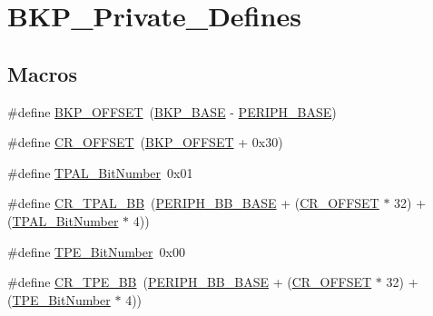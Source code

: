 \hypertarget{group___b_k_p___private___defines}{}\section{B\+K\+P\+\_\+\+Private\+\_\+\+Defines}
\label{group___b_k_p___private___defines}
\subsection*{Macros}
\begin{DoxyCompactItemize}
\item 
\#define \mbox{\hyperlink{group___b_k_p___private___defines_gaaaf71f474657e7c0c5b0d6ba9697cf5d}{B\+K\+P\+\_\+\+O\+F\+F\+S\+ET}}~(\mbox{\hyperlink{group___peripheral__memory__map_gaa15d5a9f40794105397ba5ea567c4ae1}{B\+K\+P\+\_\+\+B\+A\+SE}} -\/ \mbox{\hyperlink{group___peripheral__memory__map_ga9171f49478fa86d932f89e78e73b88b0}{P\+E\+R\+I\+P\+H\+\_\+\+B\+A\+SE}})
\item 
\#define \mbox{\hyperlink{group___b_k_p___private___defines_gafa1d3d0ea72132df651c76fc1bdffffc}{C\+R\+\_\+\+O\+F\+F\+S\+ET}}~(\mbox{\hyperlink{group___b_k_p___private___defines_gaaaf71f474657e7c0c5b0d6ba9697cf5d}{B\+K\+P\+\_\+\+O\+F\+F\+S\+ET}} + 0x30)
\item 
\#define \mbox{\hyperlink{group___b_k_p___private___defines_ga4af1869d665b8804104b6754c787820a}{T\+P\+A\+L\+\_\+\+Bit\+Number}}~0x01
\item 
\#define \mbox{\hyperlink{group___b_k_p___private___defines_gaa36e52f37b9fa6982bd224a6dcb86f78}{C\+R\+\_\+\+T\+P\+A\+L\+\_\+\+BB}}~(\mbox{\hyperlink{group___peripheral__memory__map_gaed7efc100877000845c236ccdc9e144a}{P\+E\+R\+I\+P\+H\+\_\+\+B\+B\+\_\+\+B\+A\+SE}} + (\mbox{\hyperlink{group___r_c_c___private___defines_gafa1d3d0ea72132df651c76fc1bdffffc}{C\+R\+\_\+\+O\+F\+F\+S\+ET}} $\ast$ 32) + (\mbox{\hyperlink{group___b_k_p___private___defines_ga4af1869d665b8804104b6754c787820a}{T\+P\+A\+L\+\_\+\+Bit\+Number}} $\ast$ 4))
\item 
\#define \mbox{\hyperlink{group___b_k_p___private___defines_ga8c68be900246b028ff4af93ad119eb98}{T\+P\+E\+\_\+\+Bit\+Number}}~0x00
\item 
\#define \mbox{\hyperlink{group___b_k_p___private___defines_ga6c11e801c2c1aa87ec2feaefe12bbb96}{C\+R\+\_\+\+T\+P\+E\+\_\+\+BB}}~(\mbox{\hyperlink{group___peripheral__memory__map_gaed7efc100877000845c236ccdc9e144a}{P\+E\+R\+I\+P\+H\+\_\+\+B\+B\+\_\+\+B\+A\+SE}} + (\mbox{\hyperlink{group___r_c_c___private___defines_gafa1d3d0ea72132df651c76fc1bdffffc}{C\+R\+\_\+\+O\+F\+F\+S\+ET}} $\ast$ 32) + (\mbox{\hyperlink{group___b_k_p___private___defines_ga8c68be900246b028ff4af93ad119eb98}{T\+P\+E\+\_\+\+Bit\+Number}} $\ast$ 4))

\end{DoxyCompactItemize}
